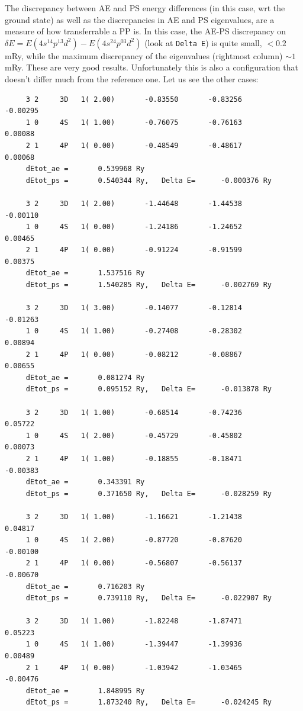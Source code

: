 \documentclass[12pt,a4paper]{article}
\begin{document}
The discrepancy between AE and PS energy differences (in this case,
wrt the ground state) as well as the discrepancies in AE and PS 
eigenvalues, are a measure of how transferrable a PP is. In this case,
the AE-PS discrepancy on $\delta E = E(4s^14p^13d^2) - E(4s^24p^03d^2)$
(look at \texttt{Delta E}) is quite small, $<0.2$ mRy, while the 
maximum discrepancy of the eigenvalues (rightmost column) $\sim 1$ mRy. 
These are very good results.
Unfortunately this is also a configuration that doesn't differ much
from the reference one. Let us see the other cases:
\begin{verbatim}
     3 2     3D   1( 2.00)       -0.83550       -0.83256       -0.00295
     1 0     4S   1( 1.00)       -0.76075       -0.76163        0.00088
     2 1     4P   1( 0.00)       -0.48549       -0.48617        0.00068
     dEtot_ae =       0.539968 Ry
     dEtot_ps =       0.540344 Ry,   Delta E=      -0.000376 Ry
 
     3 2     3D   1( 2.00)       -1.44648       -1.44538       -0.00110
     1 0     4S   1( 0.00)       -1.24186       -1.24652        0.00465
     2 1     4P   1( 0.00)       -0.91224       -0.91599        0.00375
     dEtot_ae =       1.537516 Ry
     dEtot_ps =       1.540285 Ry,   Delta E=      -0.002769 Ry
 
     3 2     3D   1( 3.00)       -0.14077       -0.12814       -0.01263
     1 0     4S   1( 1.00)       -0.27408       -0.28302        0.00894
     2 1     4P   1( 0.00)       -0.08212       -0.08867        0.00655
     dEtot_ae =       0.081274 Ry
     dEtot_ps =       0.095152 Ry,   Delta E=      -0.013878 Ry
 
     3 2     3D   1( 1.00)       -0.68514       -0.74236        0.05722
     1 0     4S   1( 2.00)       -0.45729       -0.45802        0.00073
     2 1     4P   1( 1.00)       -0.18855       -0.18471       -0.00383
     dEtot_ae =       0.343391 Ry
     dEtot_ps =       0.371650 Ry,   Delta E=      -0.028259 Ry
 
     3 2     3D   1( 1.00)       -1.16621       -1.21438        0.04817
     1 0     4S   1( 2.00)       -0.87720       -0.87620       -0.00100
     2 1     4P   1( 0.00)       -0.56807       -0.56137       -0.00670
     dEtot_ae =       0.716203 Ry
     dEtot_ps =       0.739110 Ry,   Delta E=      -0.022907 Ry
 
     3 2     3D   1( 1.00)       -1.82248       -1.87471        0.05223
     1 0     4S   1( 1.00)       -1.39447       -1.39936        0.00489
     2 1     4P   1( 0.00)       -1.03942       -1.03465       -0.00476
     dEtot_ae =       1.848995 Ry
     dEtot_ps =       1.873240 Ry,   Delta E=      -0.024245 Ry
 

\end{verbatim}
\end{document}
